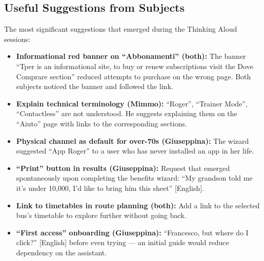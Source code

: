 ﻿\documentclass[11pt,a4paper]{article}
\begin{document}
\subsection*{Useful Suggestions from Subjects}
\begin{tcolorbox}[base]
The most significant suggestions that emerged during the Thinking
Aloud sessions:

\begin{itemize}[leftmargin=*]
  \item \textbf{Informational red banner on ``Abbonamenti'' (both):}
  The banner ``Tper is an informational site, to buy or renew subscriptions visit the Dove Comprare section'' reduced attempts to purchase on the wrong page. Both subjects noticed the banner and followed the link.

  \item \textbf{Explain technical terminology (Mimmo):} ``Roger'',
  ``Trainer Mode'', ``Contactless'' are not understood. He suggests
  explaining them on the ``Aiuto'' page with links to the corresponding sections.

  \item \textbf{Physical channel as default for over-70s (Giuseppina):} The
  wizard suggested ``App Roger'' to a user who has never
  installed an app in her life.

  \item \textbf{``Print'' button in results (Giuseppina):} Request
  that emerged spontaneously upon completing the benefits wizard: ``My
  grandson told me it's under 10,000, I'd like to bring him this
  sheet'' [English].

  \item \textbf{Link to timetables in route planning (both):}
  Add a link to the selected bus's timetable to
  explore further without going back.

  \item \textbf{``First access'' onboarding (Giuseppina):} ``Francesco,
  but where do I click?'' [English] before even trying --- an initial guide
  would reduce dependency on the assistant.
\end{itemize}
\end{tcolorbox}

\vspace{0.2cm}
\end{document}
